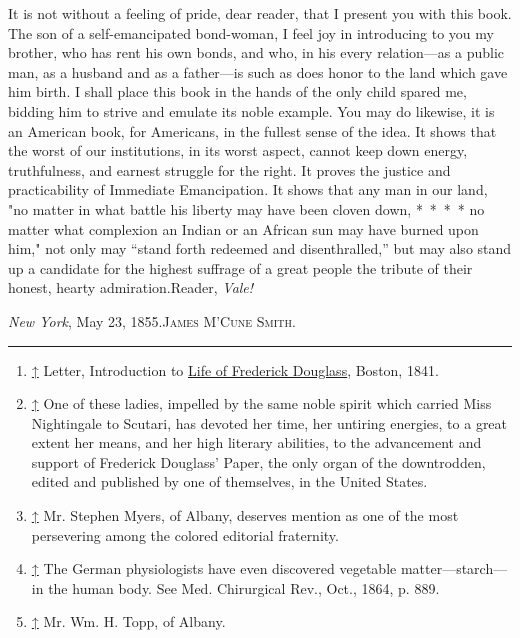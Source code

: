 It is not without a feeling of pride, dear reader, that I present you
with this book. The son of a self-emancipated bond-woman, I feel joy in
introducing to you my brother, who has rent his own bonds, and who, in
his every relation---as a public man, as a husband and as a father---is
such as does honor to the land which gave him birth. I shall place this
book in the hands of the only child spared me, bidding him to strive and
emulate its noble example. You may do likewise, it is an American book,
for Americans, in the fullest sense of the idea. It shows that the worst
of our institutions, in its worst aspect, cannot keep down energy,
truthfulness, and earnest struggle for the right. It proves the justice
and practicability of Immediate Emancipation. It shows that any man in
our land, "no matter in what battle his liberty may have been cloven
down, {*~*~*~*} no matter what complexion an Indian or an African sun
may have burned upon him," not only may ``stand forth redeemed and
disenthralled,'' but may also stand up a candidate for the highest
suffrage of a great people the tribute of their honest, hearty
admiration.{}Reader, \emph{Vale!}

{}\emph{New York}, May 23, 1855.{\textsc{James M'Cune Smith.}}

\begin{center}\rule{0.5\linewidth}{\linethickness}\end{center}

\begin{enumerate}
\item
  \hypertarget{cite_note-1}{}

  {\protect\hyperlink{cite_ref-1}{↑}} {Letter, Introduction to
  \href{/wiki/Life_of_Frederick_Douglass}{Life of Frederick Douglass},
  Boston, 1841.}
\item
  \hypertarget{cite_note-2}{}

  {\protect\hyperlink{cite_ref-2}{↑}} {One of these ladies, impelled by
  the same noble spirit which carried Miss Nightingale to Scutari, has
  devoted her time, her untiring energies, to a great extent her means,
  and her high literary abilities, to the advancement and support of
  Frederick Douglass' Paper, the only organ of the downtrodden, edited
  and published by one of themselves, in the United States.}
\item
  \hypertarget{cite_note-3}{}

  {\protect\hyperlink{cite_ref-3}{↑}} {Mr. Stephen Myers, of Albany,
  deserves mention as one of the most persevering among the colored
  editorial fraternity.}
\item
  \hypertarget{cite_note-4}{}

  {\protect\hyperlink{cite_ref-4}{↑}} {The German physiologists have
  even discovered vegetable matter---starch---in the human body. See
  Med. Chirurgical Rev., Oct., 1864, p. 889.}
\item
  \hypertarget{cite_note-5}{}

  {\protect\hyperlink{cite_ref-5}{↑}} {Mr. Wm. H. Topp, of Albany.}
\end{enumerate}
